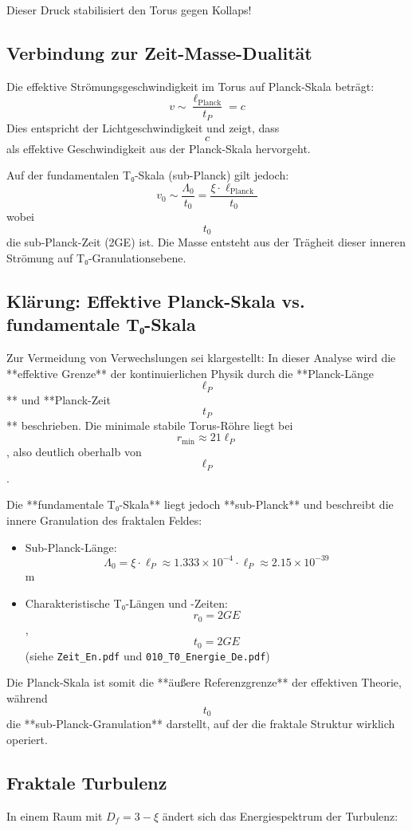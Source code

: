 	Dieser Druck stabilisiert den Torus gegen Kollaps!

	\subsection{Verbindung zur Zeit-Masse-Dualität}
	Die effektive Strömungsgeschwindigkeit im Torus auf Planck-Skala beträgt:
	$$   
	v \sim \frac{\ell_{\text{Planck}}}{t_P} = c
	$$
	Dies entspricht der Lichtgeschwindigkeit und zeigt, dass $$   c   $$ als effektive Geschwindigkeit aus der Planck-Skala hervorgeht.
	
	Auf der fundamentalen T₀-Skala (sub-Planck) gilt jedoch:
	$$   
	v_0 \sim \frac{\Lambda_0}{t_0} = \frac{\xi \cdot \ell_{\text{Planck}}}{t_0}
	$$
	wobei $$   t_0   $$ die sub-Planck-Zeit (2GE) ist. Die Masse entsteht aus der Trägheit dieser inneren Strömung auf T₀-Granulationsebene.
	
	\subsection{Klärung: Effektive Planck-Skala vs. fundamentale T₀-Skala}
	Zur Vermeidung von Verwechslungen sei klargestellt: In dieser Analyse wird die **effektive Grenze** der kontinuierlichen Physik durch die **Planck-Länge $$   \ell_P   $$** und **Planck-Zeit $$   t_P   $$** beschrieben. Die minimale stabile Torus-Röhre liegt bei $$   r_{\min} \approx 21 \ell_P   $$, also deutlich oberhalb von $$   \ell_P   $$.
	
	Die **fundamentale T₀-Skala** liegt jedoch **sub-Planck** und beschreibt die innere Granulation des fraktalen Feldes:
	\begin{itemize}
		\item Sub-Planck-Länge: $$   \Lambda_0 = \xi \cdot \ell_P \approx 1.333 \times 10^{-4} \cdot \ell_P \approx 2.15 \times 10^{-39}   $$ m
		\item Charakteristische T₀-Längen und -Zeiten: $$   r_0 = 2GE   $$, $$   t_0 = 2GE   $$ (siehe \texttt{Zeit\_En.pdf} und \texttt{010\_T0\_Energie\_De.pdf})
	\end{itemize}
	
	Die Planck-Skala ist somit die **äußere Referenzgrenze** der effektiven Theorie, während $$   t_0   $$ die **sub-Planck-Granulation** darstellt, auf der die fraktale Struktur wirklich operiert.
	
	\subsection{Fraktale Turbulenz}
	In einem Raum mit \( D_f = 3 - \xi \) ändert sich das Energiespektrum der Turbulenz:
	
